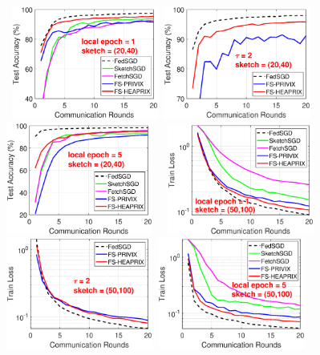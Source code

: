 \documentclass[11pt]{article}
\begin{document}
\begin{figure}[h]
\begin{center}
		\mbox{%
		\includegraphics[width=1.9in]{MNIST_figures/local1_sketch20_iid1_test_acc.eps} %
		\includegraphics[width=1.9in]{MNIST_figures/local2_sketch20_iid1_test_acc.eps} %
		\includegraphics[width=1.9in]{MNIST_figures/local5_sketch20_iid1_test_acc.eps}%
		}
		\mbox{%
		\includegraphics[width=1.9in]{MNIST_figures/local1_sketch50_iid1_train_loss.eps}%
		\includegraphics[width=1.9in]{MNIST_figures/local2_sketch50_iid1_train_loss.eps} %
		\includegraphics[width=1.9in]{MNIST_figures/local5_sketch50_iid1_train_loss.eps}}

\end{center}
\end{figure}
\end{document}

